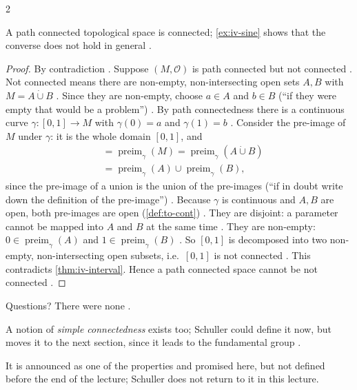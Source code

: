 \begin{paracol}{2}
\begin{theorem}\label{thm:iv-path-conn}
A path connected topological space is connected; \cref{ex:iv-sine} shows that the converse does not hold in general .
\end{theorem}
\begin{proof}
By contradiction . Suppose $(M,\mathcal O)$ is path connected but not connected . Not connected means there are non-empty, non-intersecting
open sets $A,B$ with $M=A\mathbin{\dot\cup}B$ . Since they are non-empty, choose $a\in A$ and $b\in B$ (``if they were empty that would be a problem'')
. By path connectedness there is a continuous curve $\gamma\colon[0,1]\to M$ with $\gamma(0)=a$ and $\gamma(1)=b$ .
Consider the pre-image of $M$ under $\gamma$: it is the whole domain $[0,1]$, and
\begin{align*}
  [0,1]&=\operatorname{preim}_\gamma(M)=\operatorname{preim}_\gamma(A\mathbin{\dot\cup}B)\\
  &=\operatorname{preim}_\gamma(A)\cup\operatorname{preim}_\gamma(B),
\end{align*}
since the pre-image of a union is the union of the pre-images (``if in doubt write down the definition of the pre-image'') .
Because $\gamma$ is continuous and $A,B$ are open, both pre-images are open (\cref{def:to-cont}) . They are disjoint: a parameter cannot be mapped into $A$ and $B$ at the same time
. They are non-empty: $0\in\operatorname{preim}_\gamma(A)$ and $1\in\operatorname{preim}_\gamma(B)$ .
So $[0,1]$ is decomposed into two non-empty, non-intersecting open subsets, i.e.\ $[0,1]$ is not connected . This contradicts \cref{thm:iv-interval}. Hence a path connected space cannot be not connected
.
\end{proof}
Questions? There were none .

A notion of \emph{simple connectedness} exists too; Schuller could define it now, but moves it to the next section, since it leads to the fundamental group .
\begin{coursenote}
It is announced as one of the properties and promised here, but not defined before the end of the lecture; Schuller does not return to it in this lecture.
\end{coursenote}


\end{paracol}
